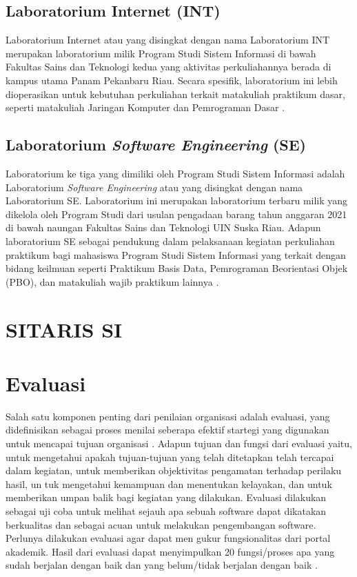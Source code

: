\subsection{Laboratorium Internet (INT)}
Laboratorium Internet atau yang disingkat dengan nama Laboratorium INT merupakan laboratorium milik Program Studi Sistem Informasi di bawah Fakultas Sains dan Teknologi kedua yang aktivitas perkuliahannya berada di kampus utama Panam Pekanbaru Riau. Secara spesifik, laboratorium ini lebih dioperasikan untuk kebutuhan perkuliahan terkait matakuliah praktikum dasar, seperti matakuliah Jaringan Komputer dan Pemrograman Dasar \cite{lab-si-website}.

\subsection{Laboratorium \textit{Software Engineering} (SE)}
Laboratorium ke tiga yang dimiliki oleh Program Studi Sistem Informasi adalah Laboratorium \textit{Software Engineering} atau yang disingkat dengan nama Laboratorium SE. Laboratorium ini merupakan laboratorium terbaru milik yang dikelola oleh Program Studi dari usulan pengadaan barang tahun anggaran 2021 di bawah naungan Fakultas Sains dan Teknologi UIN Suska Riau. Adapun laboratorium SE sebagai pendukung dalam pelaksanaan kegiatan perkuliahan praktikum bagi mahasiswa Program Studi Sistem Informasi yang terkait dengan bidang keilmuan seperti Praktikum Basis Data, Pemrograman Beorientasi Objek (PBO), dan matakuliah wajib praktikum lainnya \cite{lab-si-website}.

\section{SITARIS SI}

\section{Evaluasi}
Salah satu komponen penting dari penilaian organisasi adalah evaluasi, yang didefinisikan sebagai proses menilai seberapa efektif startegi yang digunakan untuk mencapai tujuan organisasi \cite{al2018evaluasi}. Adapun tujuan dan fungsi dari evaluasi yaitu, untuk mengetahui apakah tujuan-tujuan yang telah ditetapkan telah tercapai dalam kegiatan, untuk memberikan objektivitas pengamatan terhadap perilaku hasil, un tuk mengetahui kemampuan dan menentukan kelayakan, dan untuk memberikan umpan balik bagi kegiatan yang dilakukan. Evaluasi dilakukan sebagai uji coba untuk melihat sejauh apa sebuah software dapat dikatakan berkualitas dan sebagai acuan untuk melakukan pengembangan software. Perlunya dilakukan evaluasi agar dapat men gukur fungsionalitas dari portal akademik. Hasil dari evaluasi dapat menyimpulkan 20 fungsi/proses apa yang sudah berjalan dengan baik dan yang belum/tidak berjalan dengan baik \cite{terttiaavini2014analisa}.

